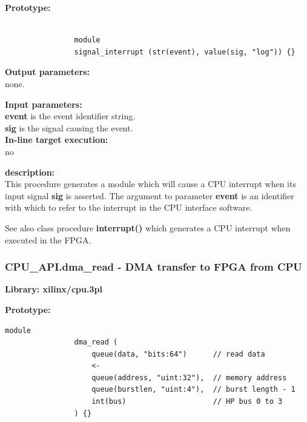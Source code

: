             {\bf Prototype:} \\
            \vsp
            \begin{lstlisting}[gobble=12, language=threepl]

                module
                signal_interrupt (str(event), value(sig, "log")) {}
            \end{lstlisting}

            {\bf Output parameters:} \\
            
            none.

            {\bf Input parameters:} \\
            {\bf event} is the event identifier string.\\
            {\bf sig} is the signal causing the event.\\
        
            {\bf In-line target execution:} \\
            no

            {\bf description:} \\
            This procedure generates a module which will cause a CPU interrupt
            when its input signal {\bf sig} is asserted.
            The argument to parameter {\bf event} is an identifier with
            which to refer to the interrupt in the CPU interface software.

            See also class procedure {\bf interrupt()}
             which generates a CPU interrupt when
            executed in the FPGA.
    
     
     
     
     
        \subsubsection{CPU\_API.dma\_read - DMA transfer to FPGA from CPU}\label{sec:lpcpudmar}

            {\bf Library: xilinx/cpu.3pl}

            {\bf Prototype:} \\
            \vsp
            \begin{lstlisting}[gobble=12, language=threepl]
                module
                dma_read (
                    queue(data, "bits:64")      // read data
                    <-
                    queue(address, "uint:32"),  // memory address
                    queue(burstlen, "uint:4"),  // burst length - 1
                    int(bus)                    // HP bus 0 to 3
                ) {}
            \end{lstlisting}

